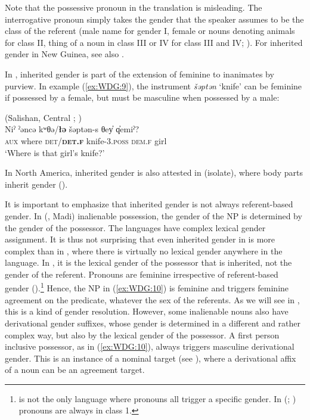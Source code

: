 \documentclass[output=collectionpaper]{langsci/langscibook}
\begin{document}
Note that the possessive pronoun in the  translation is misleading. The interrogative pronoun simply takes the gender that the speaker assumes to be the class of the referent (male name for gender I, female or nouns denoting animals for class II, thing of a noun in class III or IV for class III and IV; \citealt[187--188]{Olsson2017}). For inherited gender in New Guinea, see also \cite[177]{Fedden2011}.

In , inherited gender is part of the extension of feminine to inanimates by purview. In example (\ref{ex:WDG:9}), the instrument \textit{šəptən} `knife' can be feminine if possessed by a female, but must be masculine when possessed by a male:

\ea\label{ex:WDG:9}
 (Salishan, Central ; \citealt{Gerdts2013})\\
\gll Niˀ	ˀəncə	kʷθə/\textbf{łə}	šəptən-s	θey̓	q̓emiˀ?\\
\textsc{aux}	where	\textsc{det}/\textbf{\textsc{det.f}}	knife-3.\textsc{poss}	\textsc{dem.f}	girl\\
\glt `Where is that girl's knife?'\\
\z

In North America, inherited gender is also attested in  (isolate), where body parts inherit gender (\citealt[23]{Swanton1921}).

It is important to emphasize that inherited gender is not always referent-based gender. In  (, Madi) inalienable possession, the gender of the NP is determined by the gender of the possessor. The  languages have complex lexical gender assignment. It is thus not surprising that even inherited gender in  is more complex than in , where there is virtually no lexical gender anywhere in the language. In , it is the lexical gender of the possessor that is inherited, not the gender of the referent. Pronouns are feminine irrespective of referent-based gender (\citealt[489]{Dixon2000}).\footnote{%
 is not the only language where pronouns all trigger a specific gender. In  (; ) pronouns are always in class 1.
} %
Hence, the NP in (\ref{ex:WDG:10}) is feminine and triggers feminine agreement on the predicate, whatever the sex of the referents. As we will see in , this is a kind of gender resolution. However, some inalienable nouns also have derivational gender suffixes, whose gender is determined in a different and rather complex way, but also by the lexical gender of the possessor. A first person inclusive possessor, as in (\ref{ex:WDG:10}), always triggers masculine derivational gender. This is an instance of a nominal target (see ), where a derivational affix of a noun can be an agreement target.
\end{document}
